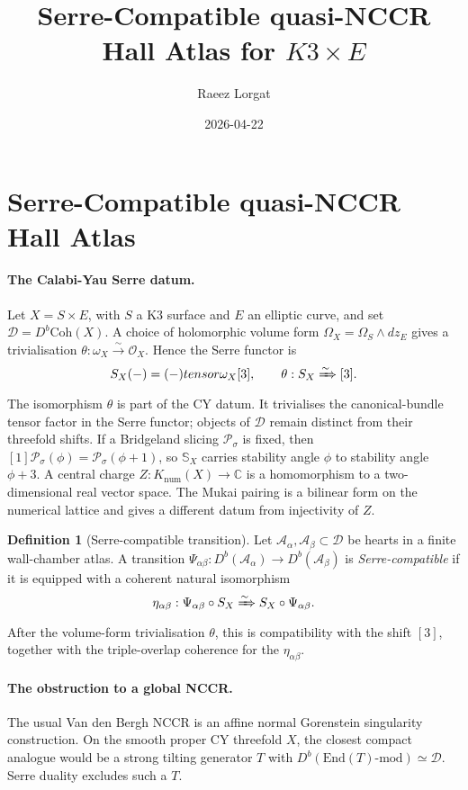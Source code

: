 \documentclass[11pt]{article}
\title{Serre-Compatible quasi-NCCR Hall Atlas for $K3\times E$}
\author{Raeez Lorgat}
\date{2026-04-22}
\providecommand{\cD}{\mathcal{D}}
\providecommand{\cO}{\mathcal{O}}
\providecommand{\bC}{\mathbb{C}}
\providecommand{\bS}{\mathbb{S}}
\providecommand{\Coh}{\mathrm{Coh}}
\providecommand{\Db}{D^{b}\!\Coh}
\providecommand{\End}{\mathrm{End}}
\providecommand{\NCCR}{\mathrm{NCCR}}
\theoremstyle{plain}
\theoremstyle{definition}
\newtheorem{definition}[theorem]{Definition}
\begin{document}
\maketitle

\section*{Serre-Compatible quasi-NCCR Hall Atlas}

\paragraph*{The Calabi-Yau Serre datum.}
Let \(X=S\times E\), with \(S\) a K3 surface and \(E\) an elliptic
curve, and set \(\cD=\Db(X)\). A choice of holomorphic volume form
\(\Omega_X=\Omega_S\wedge dz_E\) gives a trivialisation
\(\theta\colon \omega_X\xrightarrow{\sim}\cO_X\). Hence the Serre
functor is
\[
  \bS_X(-)=(-)\otimes \omega_X[3],
  \qquad
  \theta\colon \bS_X\xRightarrow{\sim}[3].
\]
The isomorphism \(\theta\) is part of the CY datum. It trivialises the
canonical-bundle tensor factor in the Serre functor; objects of \(\cD\)
remain distinct from their threefold shifts. If a Bridgeland
slicing \(\mathcal P_\sigma\) is fixed,
then \([1]\mathcal P_\sigma(\phi)=\mathcal P_\sigma(\phi+1)\), so
\(\bS_X\) carries stability angle \(\phi\) to stability angle
\(\phi+3\). A central charge
\(Z\colon K_{\mathrm{num}}(X)\to\bC\) is a homomorphism to a
two-dimensional real vector space. The Mukai pairing is a bilinear form
on the numerical lattice and gives a different datum from injectivity of
\(Z\).

\begin{definition}[Serre-compatible transition]
Let \(\mathcal A_\alpha,\mathcal A_\beta\subset\cD\) be hearts in a
finite wall-chamber atlas. A transition
\(\Psi_{\alpha\beta}\colon D^b(\mathcal A_\alpha)\to
D^b(\mathcal A_\beta)\) is \emph{Serre-compatible} if it is equipped
with a coherent natural isomorphism
\[
  \eta_{\alpha\beta}\colon
  \Psi_{\alpha\beta}\circ\bS_X
  \xRightarrow{\sim}
  \bS_X\circ\Psi_{\alpha\beta}.
\]
After the volume-form trivialisation \(\theta\), this is compatibility
with the shift \([3]\), together with the triple-overlap coherence for
the \(\eta_{\alpha\beta}\).
\end{definition}

\paragraph*{The obstruction to a global NCCR.}
The usual Van den Bergh \(\NCCR\) is an affine normal Gorenstein
singularity construction. On the smooth proper CY threefold \(X\), the
closest compact analogue would be a strong tilting generator \(T\) with
\(D^b(\End(T)\text{-mod})\simeq\cD\). Serre duality excludes such a
\(T\).
\end{document}
